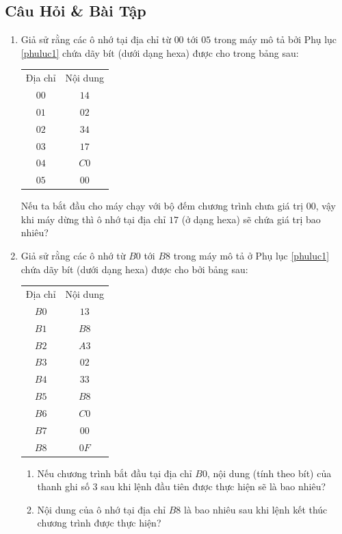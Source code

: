 \subsection*{Câu Hỏi \& Bài Tập}
\begin{enumerate}
\item Giả sử rằng các ô nhớ tại địa chỉ từ $00$ tới $05$ trong máy mô tả bởi Phụ lục
  \ref{phuluc1} chứa dãy bít (dưới dạng hexa) được cho trong bảng sau:

\begin{tabular}{cc}
  Địa chỉ & Nội dung \\
  $00$    & $14$     \\
  $01$    & $02$     \\
  $02$    & $34$     \\
  $03$    & $17$     \\
  $04$    & $C0$     \\
  $05$     & $00$
\end{tabular}

Nếu ta bắt đầu cho máy chạy với bộ đếm chương trình chưa giá trị $00$, vậy khi máy
dừng thì ô nhớ tại địa chỉ $17$ (ở dạng hexa) sẽ chứa giá trị bao nhiêu?

\item Giả sử rằng các ô nhớ từ $B0$ tới $B8$ trong máy mô tả ở Phụ lục \ref{phuluc1} chứa
  dãy bít (dưới dạng hexa) được cho bởi bảng sau:

\begin{tabular}{cc}
  Địa chỉ & Nội dung \\
  $B0$    & $13$     \\
  $B1$    & $B8$     \\
  $B2$    & $A3$     \\
  $B3$    & $02$     \\
  $B4$    & $33$     \\
  $B5$     & $B8$ \\
  $B6$    & $C0$     \\
  $B7$    & $00$     \\
  $B8$     & $0F$ 
\end{tabular}
\begin{enumerate}
\item Nếu chương trình bắt đầu tại địa chỉ $B0$, nội dung (tính theo bít) của thanh ghi số
  $3$ sau khi lệnh đầu tiên được thực hiện sẽ là bao nhiêu?

\item Nội dung của ô nhớ tại địa chỉ $B8$ là bao nhiêu sau khi lệnh kết thúc chương trình
  được thực hiện?
\end{enumerate}


\end{enumerate}

